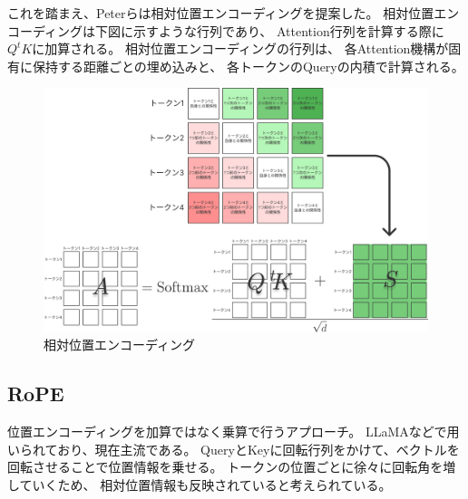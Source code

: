 \documentclass{jsarticle}
\begin{document}
        これを踏まえ、Peterら\cite{relative}は相対位置エンコーディングを提案した。
        相対位置エンコーディングは下図に示すような行列であり、
        Attention行列を計算する際に$Q^t\!K$に加算される。
        相対位置エンコーディングの行列は、
        各Attention機構が固有に保持する距離ごとの埋め込みと、
        各トークンのQueryの内積で計算される。
        \begin{figure}[h]
            \centering
            \includegraphics[width=.8\linewidth]{relative.pdf}
            \caption{相対位置エンコーディング}
        \end{figure}

    \subsection{RoPE}
        位置エンコーディングを加算ではなく乗算で行うアプローチ。
        LLaMAなどで用いられており、現在主流である。
        QueryとKeyに回転行列をかけて、ベクトルを回転させることで位置情報を乗せる。
        トークンの位置ごとに徐々に回転角を増していくため、
        相対位置情報も反映されていると考えられている。
\end{document}
